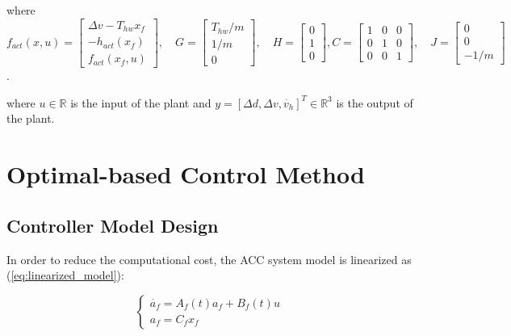 \documentclass{article}
\numberwithin{equation}{section}
\begin{document}
\noindent where 
$f_{a c t}(x,u)=\left[\begin{array}{c}
    \Delta v-T_{h w} x_{f} \\
    -h_{a c t}\left(x_{f}\right) \\
    f_{a c t}\left(x_{f}, u\right)
    \end{array}\right], \quad G=\left[\begin{array}{c}
    T_{h w} / m \\
    1 / m \\
    0
    \end{array}\right], \quad H=\left[\begin{array}{l}
    0 \\
    1 \\
    0
    \end{array}\right],C=\left[\begin{array}{lll}
        1 & 0 & 0 \\
        0 & 1 & 0 \\
        0 & 0 & 1
        \end{array}\right], \quad J=\left[\begin{array}{c}
        0 \\
        0 \\
        -1 / m
    \end{array}\right]$. 

\noindent where $u \in \mathbb{R}$ is the input of the plant and 
$y = [\Delta d, \Delta v, \dot{v_h}]^T \in \mathbb{R}^{3}$ is the output of the plant.

\section{Optimal-based Control Method}

\subsection{Controller Model Design}
In order to reduce the computational cost, the ACC system model is linearized as (\ref{eq:linearized_model}):

\begin{equation}
    \left\{\begin{array}{l}\label{eq:linearized_model}
        \dot{a_f}=A_f(t)a_f+B_f(t)u \\
        a_f=C_fx_f
        \end{array}\right.
\end{equation}
\end{document}
